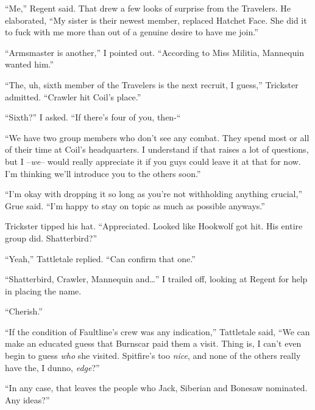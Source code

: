 ``Me,'' Regent said.  That drew a few looks of surprise from the Travelers.  He elaborated, ``My sister is their newest member, replaced Hatchet Face.  She did it to fuck with me more than out of a genuine desire to have me join.''



``Armsmaster is another,'' I pointed out.  ``According to Miss Militia, Mannequin wanted him.''



``The, uh, sixth member of the Travelers is the next recruit, I guess,'' Trickster admitted.  ``Crawler hit Coil's place.''



``Sixth?'' I asked.  ``If there's four of you, then-``



``We have two group members who don't see any combat.  They spend most or all of their time at Coil's headquarters.  I understand if that raises a lot of questions, but I –\emph{we}– would really appreciate it if you guys could leave it at that for now.  I'm thinking we'll introduce you to the others soon.''



``I'm okay with dropping it so long as you're not withholding anything crucial,'' Grue said.  ``I'm happy to stay on topic as much as possible anyways.''



Trickster tipped his hat.  ``Appreciated.  Looked like Hookwolf got hit.  His entire group did.  Shatterbird?''



``Yeah,'' Tattletale replied.  ``Can confirm that one.''



``Shatterbird, Crawler, Mannequin and\ldots'' I trailed off, looking at Regent for help in placing the name.



``Cherish.''



``If the condition of Faultline's crew was any indication,'' Tattletale said, ``We can make an educated guess that Burnscar paid them a visit.  Thing is, I can't even begin to guess \emph{who} she visited.  Spitfire's too \emph{nice}, and none of the others really have the, I dunno, \emph{edge}?''



``In any case, that leaves the people who Jack, Siberian and Bonesaw nominated.  Any ideas?''



